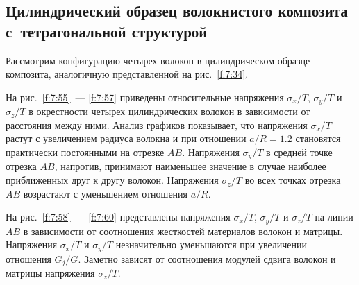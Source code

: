 \subsection{Цилиндрический образец волокнистого композита с~тетрагональной структурой}

Рассмотрим конфигурацию четырех волокон в цилиндрическом образце композита, аналогичную представленной на рис.~\ref{f:7:34}.


На рис.~\ref{f:7:55}~--- \ref{f:7:57} приведены относительные напряжения $\sigma_x/T$, $\sigma_y/T$ и $\sigma_z/T$ в окрестности четырех цилиндрических волокон в зависимости от расстояния между ними. Анализ графиков показывает, что напряжения $\sigma_x/T$ растут с увеличением радиуса волокна и при отношении $a/R=1.2$ становятся практически постоянными на отрезке $AB$. Напряжения $\sigma_y/T$ в средней точке отрезка $AB$, напротив, принимают наименьшее значение в случае наиболее приближенных друг к другу волокон. Напряжения $\sigma_z/T$ во всех точках отрезка $AB$ возрастают с уменьшением отношения $a/R$.

На рис.~\ref{f:7:58}~--- \ref{f:7:60} представлены напряжения $\sigma_x/T$, $\sigma_y/T$ и $\sigma_z/T$ на линии $AB$ в зависимости от соотношения жесткостей материалов волокон и матрицы. Напряжения $\sigma_x/T$ и $\sigma_y/T$ незначительно уменьшаются при увеличении отношения $G_j/G$. Заметно зависят от соотношения модулей сдвига волокон и матрицы напряжения $\sigma_z/T$.


%


